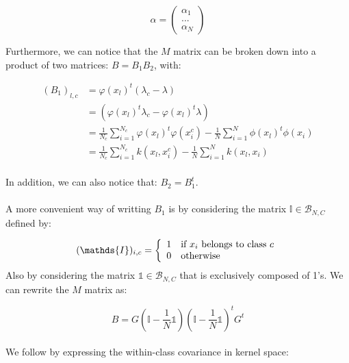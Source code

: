 \begin{equation*}
\alpha = \left( \begin{array}{c}
                                \alpha_1 \\
                                ... \\
                                \alpha_N
                  \end{array}  \right) 
\end{equation*}

Furthermore, we can notice that the $M$ matrix can be broken down into a product of two matrices: $B = B_1B_2$, with:

\begin{align*}
(B_1)_{l, c} &= \varphi(x_l)^t(\lambda_c - \lambda)\\
             &= (\varphi(x_l)^t\lambda_c -\varphi(x_l)^t\lambda) \\
             &= \frac{1}{N_c} \sum_{i=1}^{N_c} \varphi(x_l)^t\varphi(x_i^c) -
                 \frac{1}{N}\sum_{i=1}^N\phi(x_l)^t\phi(x_i) \\
             &= \frac{1}{N_c} \sum_{i = 1}^{N_c} k(x_l, x_i^c) -
                \frac{1}{N}\sum_{i=1}^N k(x_l, x_i)\\
\end{align*}

In addition, we can also notice that: $B_2 = B_1^t$.

\paragraph{}
A more convenient way of writting $B_1$ is by considering the matrix $\mathds{I} \in
\mathcal{B}_{N,C}$ defined by:

$$ (\mathds{I})_{i, c} = \left\{ \begin{array}{ll}
                                  1 & \textnormal{if $x_i$ belongs to class $c$} \\
                                  0 & \textnormal{otherwise}
                               \end{array}
                        \right.$$
Also by considering the matrix $\mathds{1} \in \mathcal{B}_{N,C}$ that is exclusively composed of
1's.
We can rewrite the $M$ matrix as:

$$B = G\left( \mathds{I} - \frac{1}{N} \mathds{1} \right)\left( \mathds{I} - \frac{1}{N} \mathds{1}\right)^tG^t$$

\paragraph{}
We follow by expressing the within-class covariance in kernel space:

